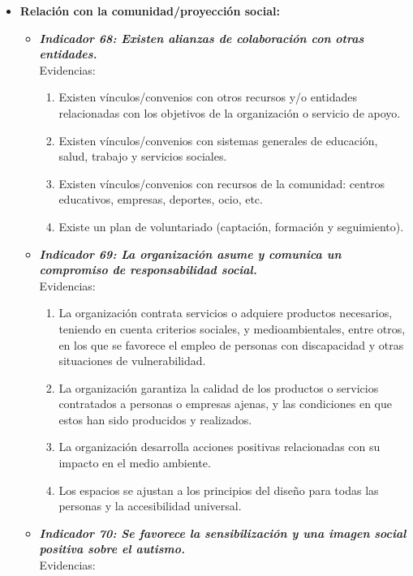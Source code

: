\begin{itemize}
	\item \textbf{Relación con la comunidad/proyección social:}
	\begin{itemize}
		\item \textbf{\textit{Indicador 68: Existen alianzas de colaboración con otras entidades.}}\\Evidencias:
			
		\begin{enumerate}
			\item Existen vínculos/convenios con otros recursos y/o entidades relacionadas con los objetivos de la organización o servicio de apoyo. 
			\item Existen vínculos/convenios con sistemas generales de educación, salud, trabajo y servicios sociales. 
			\item Existen vínculos/convenios con recursos de la comunidad: centros educativos, empresas, deportes, ocio, etc. 
			\item Existe un plan de voluntariado (captación, formación y seguimiento). 
			
		\end{enumerate}
		\item \textbf{\textit{Indicador 69: La organización asume y comunica un compromiso de responsabilidad social.}}\\Evidencias:
		
		\begin{enumerate}
			\item La organización contrata servicios o adquiere productos necesarios, teniendo en cuenta criterios sociales, y medioambientales, entre otros, en los que se favorece el empleo de personas con discapacidad y otras situaciones de vulnerabilidad.      
			\item La organización garantiza la calidad de los productos o servicios contratados a personas o empresas ajenas, y las condiciones en que estos han sido producidos y realizados.      
			\item La organización desarrolla acciones positivas relacionadas con su impacto en el medio ambiente.  
			\item Los espacios se ajustan a los principios del diseño para todas las personas y la accesibilidad universal.			
		\end{enumerate}
		\item \textbf{\textit{Indicador 70: Se favorece la sensibilización y una imagen social positiva sobre el autismo.}}\\Evidencias:
		

\end{itemize}
\end{itemize}
